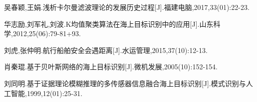 \clearpage
{}
\begin{thebibliography}{}
吴春颖,王娟.浅析卡尔曼滤波理论的发展历史过程[J].福建电脑,2017,33(01):22-23.\par
{}华志励,刘军礼,刘波.K均值聚类算法在海上目标识别中的应用[J].山东科学,2012,25(06):79-81+93.\par
{}刘虎,张仲明.航行船舶安全会遇距离[J].水运管理,2015,37(10):12-13.\par
{}肖秦琨.基于贝叶斯网络的海上目标识别[J].微机发展,2005(10):152-154.\par
{}刘同明.基于证据理论模糊推理的多传感器信息融合海上目标识别[J].模式识别与人工智能,1999,12(01):25-31.\par
\end{thebibliography}
